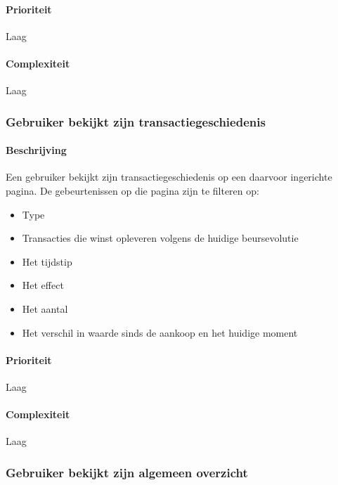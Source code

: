 \paragraph{Prioriteit}Laag
\paragraph{Complexiteit}Laag

\subsubsection{Gebruiker bekijkt zijn transactiegeschiedenis}
\paragraph{Beschrijving} Een gebruiker bekijkt zijn transactiegeschiedenis op een daarvoor ingerichte pagina. De gebeurtenissen op die pagina zijn te filteren op:
\begin{itemize}
	\item Type
	\item Transacties die winst opleveren volgens de huidige beursevolutie
	\item Het tijdstip
	\item Het effect
	\item Het aantal
	\item Het verschil in waarde sinds de aankoop en het huidige moment
\end{itemize}
\paragraph{Prioriteit}Laag
\paragraph{Complexiteit}Laag

\subsubsection{Gebruiker bekijkt zijn algemeen overzicht}
